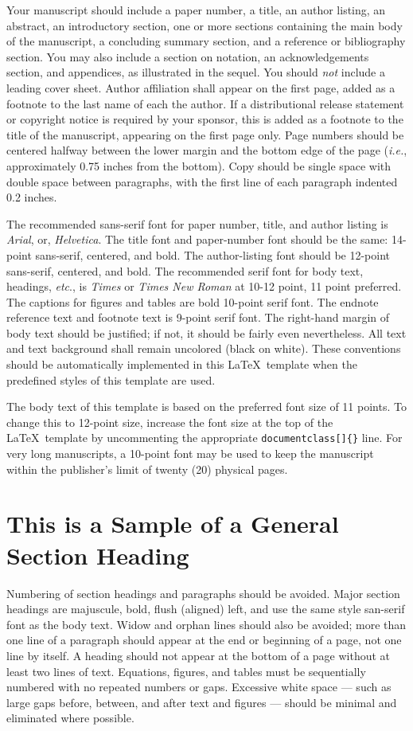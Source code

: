 \documentclass[letterpaper, preprint, paper,11pt]{AAS}	%
\begin{document}
Your manuscript should include a paper number, a title, an author listing, an abstract, an introductory section, one or more sections containing the main body of the manuscript, a concluding summary section, and a reference or bibliography section. You may also include a section on notation, an acknowledgements section, and appendices, as illustrated in the sequel. You should \emph{not} include a leading cover sheet. Author affiliation shall appear on the first page, added as a footnote to the last name of each the author. If a distributional release statement or copyright notice is required by your sponsor, this is added as a footnote to the title of the manuscript, appearing on the first page only. Page numbers should be centered halfway between the lower margin and the bottom edge of the page (\emph{i.e.}, approximately 0.75 inches from the bottom). Copy should be single space with double space between paragraphs, with the first line of each paragraph indented 0.2 inches.

The recommended sans-serif font for paper number, title, and author listing is \emph{Arial}, or, \emph{Helvetica}. The title font and paper-number font should be the same: 14-point sans-serif, centered, and bold. The author-listing font should be 12-point sans-serif, centered, and bold. The recommended serif font for body text, headings, \emph{etc}., is \emph{Times} or \emph{Times New Roman} at 10-12 point, 11 point preferred. The captions for figures and tables are bold 10-point serif font. The endnote reference text and footnote text is 9-point serif font. The right-hand margin of body text should be justified; if not, it should be fairly even nevertheless. All text and text background shall remain uncolored (black on white). These conventions should be automatically implemented in this \LaTeX\ template when the predefined styles of this template are used.

The body text of this template is based on the preferred font size of 11 points. To change this to 12-point size, increase the font size at the top of the \LaTeX\ template by uncommenting the appropriate {\tt documentclass[]\{\}} line. For very long manuscripts, a 10-point font may be used to keep the manuscript within the publisher's limit of twenty (20) physical pages.


\section{This is a Sample of a General Section Heading}
Numbering of section headings and paragraphs should be avoided. Major section headings are majuscule, bold, flush (aligned) left, and use the same style san-serif font as the body text. Widow and orphan lines should also be avoided; more than one line of a paragraph should appear at the end or beginning of a page, not one line by itself. A heading should not appear at the bottom of a page without at least two lines of text. Equations, figures, and tables must be sequentially numbered with no repeated numbers or gaps. Excessive white space --- such as large gaps before, between, and after text and figures --- should be minimal and eliminated where possible.
\end{document}
